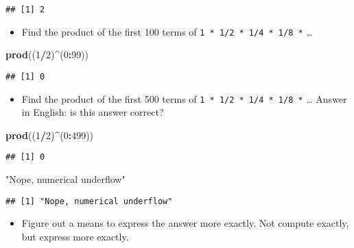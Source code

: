 \documentclass[]{article}
\newenvironment{Shaded}{\begin{snugshade}}{\end{snugshade}}
\newcommand{\KeywordTok}[1]{\textcolor[rgb]{0.13,0.29,0.53}{\textbf{#1}}}
\newcommand{\DecValTok}[1]{\textcolor[rgb]{0.00,0.00,0.81}{#1}}
\newcommand{\StringTok}[1]{\textcolor[rgb]{0.31,0.60,0.02}{#1}}
\newcommand{\OperatorTok}[1]{\textcolor[rgb]{0.81,0.36,0.00}{\textbf{#1}}}
\newcommand{\NormalTok}[1]{#1}
\providecommand{\tightlist}{%
  \setlength{\itemsep}{0pt}\setlength{\parskip}{0pt}}
\begin{document}
\begin{verbatim}
## [1] 2
\end{verbatim}

\begin{itemize}
\tightlist
\item
  Find the product of the first 100 terms of
  \texttt{1\ *\ 1/2\ *\ 1/4\ *\ 1/8\ *} \ldots{}
\end{itemize}

\begin{Shaded}
\begin{Highlighting}[]
\KeywordTok{prod}\NormalTok{((}\DecValTok{1}\OperatorTok{/}\DecValTok{2}\NormalTok{)}\OperatorTok{^}\NormalTok{(}\DecValTok{0}\OperatorTok{:}\DecValTok{99}\NormalTok{))}
\end{Highlighting}
\end{Shaded}

\begin{verbatim}
## [1] 0
\end{verbatim}

\begin{itemize}
\tightlist
\item
  Find the product of the first 500 terms of
  \texttt{1\ *\ 1/2\ *\ 1/4\ *\ 1/8\ *} \ldots{} Answer in English: is
  this answer correct?
\end{itemize}

\begin{Shaded}
\begin{Highlighting}[]
\KeywordTok{prod}\NormalTok{((}\DecValTok{1}\OperatorTok{/}\DecValTok{2}\NormalTok{)}\OperatorTok{^}\NormalTok{(}\DecValTok{0}\OperatorTok{:}\DecValTok{499}\NormalTok{))}
\end{Highlighting}
\end{Shaded}

\begin{verbatim}
## [1] 0
\end{verbatim}

\begin{Shaded}
\begin{Highlighting}[]
\StringTok{"Nope, numerical underflow"}
\end{Highlighting}
\end{Shaded}

\begin{verbatim}
## [1] "Nope, numerical underflow"
\end{verbatim}

\begin{itemize}
\tightlist
\item
  Figure out a means to express the answer more exactly. Not compute
  exactly, but express more exactly.
\end{itemize}
\end{document}
